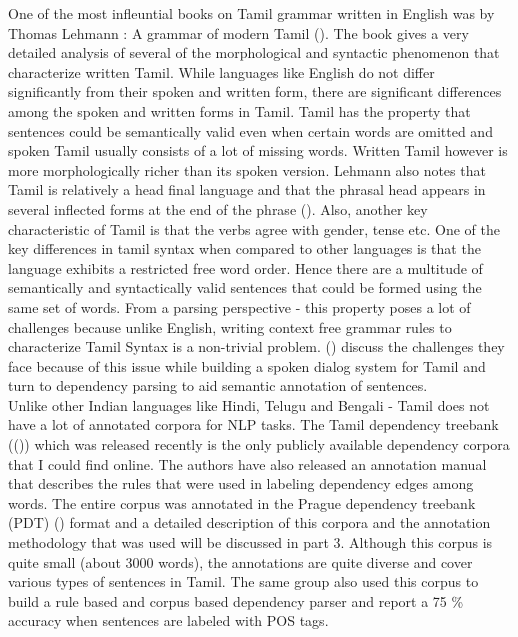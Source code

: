 \documentclass[11pt,letterpaper]{article}
\begin{document}
One of the most infleuntial books on Tamil grammar written in English was by Thomas Lehmann
: A grammar of modern Tamil (\cite{lehmann1989grammar}). The book gives a very detailed analysis of several of
the morphological and syntactic phenomenon that characterize written Tamil. While languages like English do not differ significantly
from their spoken and written form, there are significant differences among the spoken and written forms in Tamil.
Tamil has the property that sentences could be semantically valid even when certain words are omitted and spoken 
Tamil usually consists of a lot of missing words. Written Tamil however is more morphologically richer than its spoken version.
Lehmann also notes that Tamil is relatively a head final language and that the phrasal head appears in several inflected forms at
the end of the phrase (\cite{lehmann1989grammar}). Also, another key characteristic of Tamil is that the verbs agree with gender, tense etc. 
One of the key differences in tamil syntax when compared to other languages is that the language exhibits
a restricted free word order. Hence there are a multitude of semantically and syntactically valid sentences that could
be formed using the same set of words. From a parsing perspective - this property poses a lot of challenges because unlike English, writing context free grammar rules to characterize Tamil Syntax is a non-trivial problem. (\cite{vidyapeethamrobust}) discuss the challenges
they face because of this issue while building a spoken dialog system for Tamil and turn to dependency parsing to aid semantic annotation
of sentences.
\\

Unlike other Indian languages like Hindi, Telugu and Bengali - Tamil does not have a lot of annotated corpora for NLP tasks.
The Tamil dependency treebank ((\cite{ramasamy2011tamil})) which was released recently is the only publicly available dependency corpora
that I could find online. The authors have also released an annotation manual that describes the rules that were used in
labeling dependency edges among words. The entire corpus was annotated in the Prague dependency treebank (PDT) (\cite{bohmova2003prague}) format and a detailed description
of this corpora and the annotation methodology that was used will be discussed in part 3. Although this corpus is quite small (about
3000 words), the annotations are quite diverse and cover various types of sentences in Tamil. The same group also used
this corpus to build a rule based and corpus based dependency parser and report a 75 \% accuracy when sentences are labeled with POS tags.\\
\end{document}
